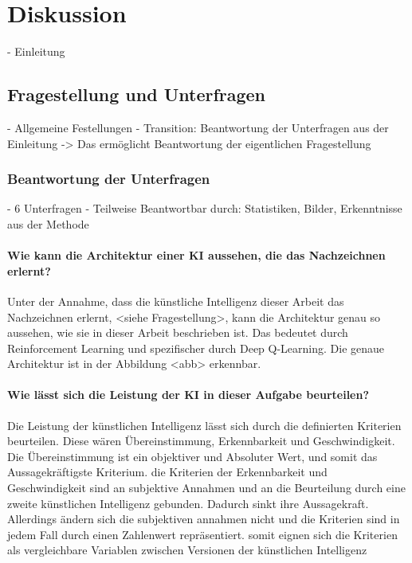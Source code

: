 \chapter{Diskussion}
- Einleitung

\section{Fragestellung und Unterfragen}
- Allgemeine Festellungen
- Transition: Beantwortung der Unterfragen aus der Einleitung -> Das ermöglicht Beantwortung der eigentlichen Fragestellung



\subsection{Beantwortung der Unterfragen}
- 6 Unterfragen
- Teilweise Beantwortbar durch: Statistiken, Bilder, Erkenntnisse aus der Methode

\subsubsection*{Wie kann die Architektur einer KI aussehen, die das Nachzeichnen erlernt?}
Unter der Annahme, dass die künstliche Intelligenz dieser Arbeit das
Nachzeichnen erlernt, <siehe Fragestellung>, kann die Architektur genau so
aussehen, wie sie in dieser Arbeit beschrieben ist. Das bedeutet durch
Reinforcement Learning und spezifischer durch Deep Q-Learning. Die genaue
Architektur ist in der Abbildung <abb> erkennbar.

\subsubsection*{Wie lässt sich die Leistung der KI in dieser Aufgabe beurteilen?}
Die Leistung der künstlichen Intelligenz lässt sich durch die definierten
Kriterien beurteilen. Diese wären Übereinstimmung, Erkennbarkeit und
Geschwindigkeit. Die Übereinstimmung ist ein objektiver und Absoluter Wert,
und somit das Aussagekräftigste Kriterium. die Kriterien der Erkennbarkeit
und Geschwindigkeit sind an subjektive Annahmen und an die Beurteilung durch
eine zweite künstlichen Intelligenz gebunden. Dadurch sinkt ihre
Aussagekraft. Allerdings ändern sich die subjektiven annahmen nicht und die
Kriterien sind in jedem Fall durch einen Zahlenwert repräsentiert. somit
eignen sich die Kriterien als vergleichbare Variablen zwischen Versionen der künstlichen Intelligenz


